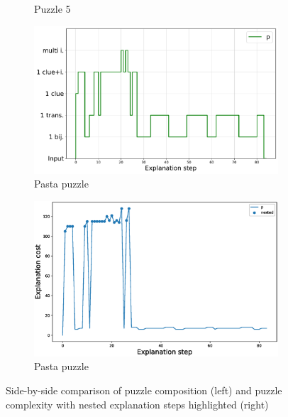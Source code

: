 \begin{figure}[t!]
\begin{subfigure}{.5\textwidth}
		\caption{Puzzle 5 }
		\label{fig:cost_puzzle:p5}
	\end{subfigure}
	\begin{subfigure}{.5\textwidth}
		\centering
		\includegraphics[width=0.9\linewidth]{figures/plot_cost_steps_p.pdf}
		\caption{Pasta puzzle}
		\label{fig:composition_puzzle:pasta}
	\end{subfigure}%
	\begin{subfigure}{.5\textwidth}
		\centering
		\includegraphics[width=0.84\linewidth]{figures/p.eps}
		\caption{Pasta puzzle}
		\label{fig:cost_puzzle:pasta}
	\end{subfigure}
	\caption{Side-by-side comparison of puzzle composition (left) and puzzle complexity with nested explanation steps highlighted (right)}
	\label{fig:steps}
\end{figure}

